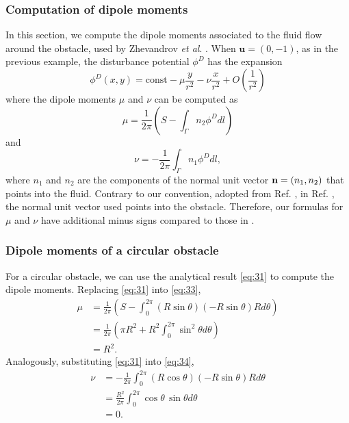 \documentclass[11pt]{article}
\begin{document}
\subsubsection{Computation of dipole moments}
In this section, we compute the dipole moments associated to the fluid flow around the obstacle, used by Zhevandrov {\it et al}. \cite{zhevandrov2025discrete}. When $\mathbf{u}=(0,-1)$, as in the previous example, the disturbance potential $\phi^D$ has the expansion
\begin{equation}
  \label{eq:32}
  \phi^D(x,y) = \mathrm{const} - \mu\frac{y}{r^2} - \nu\frac{x}{r^2} + O\left(\frac{1}{r^2}\right)
\end{equation}
where the dipole moments $\mu$ and $\nu$ can be computed as
\begin{equation}
  \label{eq:33}
  \mu = \frac{1}{2\pi}\left(S - \int_\Gamma n_2\phi^D dl\right)
\end{equation}
and
\begin{equation}
  \label{eq:34}
  \nu = -\frac{1}{2\pi}  \int_\Gamma n_1\phi^D dl,
\end{equation}
where $n_1$ and $n_2$ are the components of the normal unit vector ${\bf n}=(n_1, n_2)$ that points into the fluid. Contrary to our convention, adopted from Ref. \cite{pozrikidis2002practical}, in Ref. \cite{zhevandrov2025discrete}, the normal unit vector used points into the obstacle. Therefore, our formulas for $\mu$ and $\nu$ have additional minus signs compared to those in \cite{zhevandrov2025discrete}.

\subsubsection{Dipole moments of a circular obstacle}
For a circular obstacle, we can use the analytical result \eqref{eq:31} to compute the dipole moments. Replacing \eqref{eq:31} into \eqref{eq:33},
\begin{align}
  \label{eq:35}
  \mu &= \frac{1}{2\pi}\left(S - \int_0^{2\pi} (R\sin\theta) (-R\sin\theta) Rd\theta\right) \\
      &= \frac{1}{2\pi}\left(\pi R^2 + R^2\int_0^{2\pi} \sin^2\theta d\theta \right) \\
  & = R^2.
\end{align}
Analogously, substituting \eqref{eq:31} into \eqref{eq:34},
\begin{align}
  \nu &=  -\frac{1}{2\pi}  \int_0^{2\pi} (R\cos\theta)(-R\sin\theta) R d\theta \\
      &= \frac{R^2}{2\pi} \int_0^{2\pi} \cos\theta\,\sin\theta d\theta \\
  &= 0.
\end{align}
\end{document}
